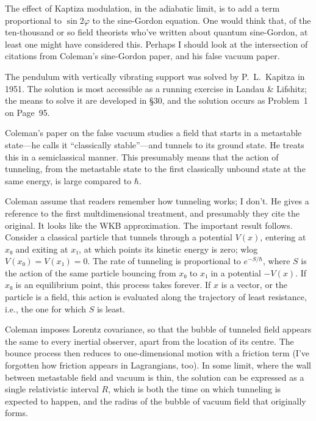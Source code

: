 The effect of Kaptiza modulation, in the adiabatic limit, is to add a term proportional to $\sin 2φ$ to the sine-Gordon equation.  One would think that, of the ten-thousand or so field theorists who've written about quantum sine-Gordon, at least one might have considered this.  Perhaps I should look at the intersection of citations from Coleman's sine-Gordon paper, and his false vacuum paper.



The pendulum with vertically vibrating support was solved by P.~L.~Kapitza in 1951.  The solution is most accessible as a running exercise in Landau \& Lifshitz; the means to solve it are developed in \S 30, and the solution occurs as Problem~1 on Page~95.



Coleman's paper on the false vacuum studies a field that starts in a metastable state—he calls it “classically stable”—and tunnels to its ground state.  He treats this in a semiclassical manner.  This presumably means that the action of tunneling, from the metastable state to the first classically unbound state at the same energy, is large compared to $\hbar$.

Coleman assume that readers remember how tunneling works; I don't.  He gives a reference to the first multdimensional treatment, and presumably they cite the original.  It looks like the WKB approximation.  The important result follows.  Consider a classical particle that tunnels through a potential $V(x)$, entering at $x₀$ and exiting at $x₁$, at which points its kinetic energy is zero; wlog $V(x₀)=V(x₁)=0$.  The rate of tunneling is proportional to $e^{-S/\hbar}$, where $S$ is the action of the same particle bouncing from $x₀$ to $x₁$ in a potential $-V(x)$.  If $x₀$ is an equilibrium point, this process takes forever.  If $x$ is a vector, or the particle is a field, this action is evaluated along the trajectory of least resistance, i.e., the one for which $S$ is least.

Coleman imposes Lorentz covariance, so that the bubble of tunneled field appears the same to every inertial observer, apart from the location of its centre.  The bounce process then reduces to one-dimensional motion with a friction term (I've forgotten how friction appears in Lagrangians, too).   In some limit, where the wall between metastable field and vacuum is thin, the solution can be expressed as a single relativistic interval $R$, which is both the time on which tunneling is expected to happen, and the radius of the bubble of vacuum field that originally forms.

